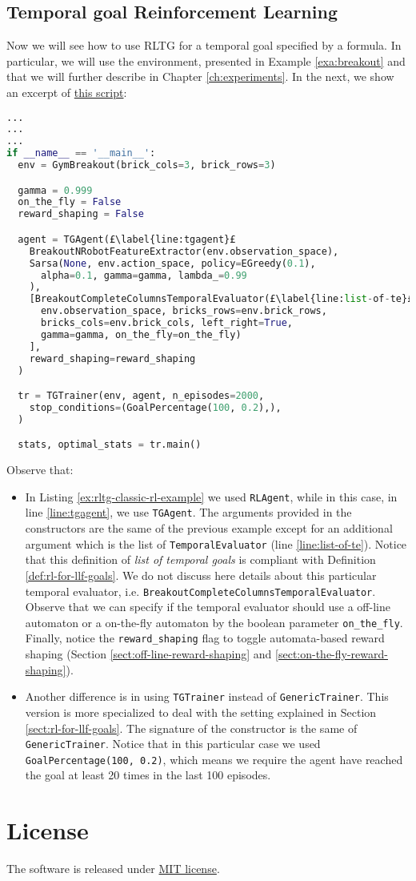 \subsection{Temporal goal Reinforcement Learning}
Now we will see how to use RLTG for a temporal goal specified by a \LLf formula. In particular, we will use the \Breakout environment, presented in Example \ref{exa:breakout} and that we will further describe in Chapter \ref{ch:experiments}. In the next, we show an excerpt of \href{https://github.com/MarcoFavorito/rltg/blob/master/examples/pygames/breakout.py}{this script}:

\begin{lstlisting}[style = Python, language = Python, escapechar = £, label={ex:rltg-temporal-goal-rl-example}, caption={Temporal Goal Reinforcement Learning using RLTG}]
...
...
...
if __name__ == '__main__':
  env = GymBreakout(brick_cols=3, brick_rows=3)

  gamma = 0.999
  on_the_fly = False
  reward_shaping = False

  agent = TGAgent(£\label{line:tgagent}£
    BreakoutNRobotFeatureExtractor(env.observation_space),
    Sarsa(None, env.action_space, policy=EGreedy(0.1),
      alpha=0.1, gamma=gamma, lambda_=0.99
    ),
    [BreakoutCompleteColumnsTemporalEvaluator(£\label{line:list-of-te}£
      env.observation_space, bricks_rows=env.brick_rows, 
      bricks_cols=env.brick_cols, left_right=True, 
      gamma=gamma, on_the_fly=on_the_fly)
    ],
    reward_shaping=reward_shaping
  )

  tr = TGTrainer(env, agent, n_episodes=2000,
    stop_conditions=(GoalPercentage(100, 0.2),),
  )

  stats, optimal_stats = tr.main()
\end{lstlisting}
Observe that:
\begin{itemize}
	\item In Listing \ref{ex:rltg-classic-rl-example} we used \texttt{RLAgent}, while in this case, in line \ref{line:tgagent}, we use \texttt{TGAgent}. The arguments provided in the constructors are the same of the previous example except for an additional argument which is the list of \texttt{TemporalEvaluator} (line \ref{line:list-of-te}). Notice that this definition of \emph{list of temporal goals} is compliant with Definition \ref{def:rl-for-llf-goals}. We do not discuss here details about this particular temporal evaluator, i.e. \texttt{BreakoutCompleteColumnsTemporalEvaluator}. Observe that we can specify if the temporal evaluator should use a off-line automaton or a on-the-fly automaton by the boolean parameter \texttt{on\_the\_fly}. Finally, notice the \texttt{reward\_shaping} flag to toggle automata-based reward shaping (Section \ref{sect:off-line-reward-shaping} and \ref{sect:on-the-fly-reward-shaping}).
	\item Another difference is in using \texttt{TGTrainer} instead of \texttt{GenericTrainer}. This version is more specialized to deal with the setting explained in Section \ref{sect:rl-for-llf-goals}. The signature of the constructor is the same of \texttt{GenericTrainer}. Notice that in this particular case we used \texttt{GoalPercentage(100, 0.2)}, which means we require the agent have reached the goal at least 20 times in the last 100 episodes.
\end{itemize}
\section{License}
The software is released under \href{https://github.com/MarcoFavorito/rltg/blob/master/LICENSE}{MIT license}.